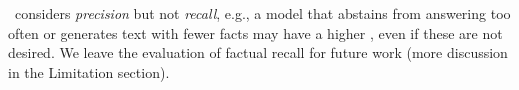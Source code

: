 \ours\ considers {\em precision} but not {\em recall}, e.g., a model that abstains from answering too often or generates text with fewer facts may have a higher \ours, even if these are not desired.
We leave the evaluation of factual recall for future work (more discussion in the Limitation section). %


